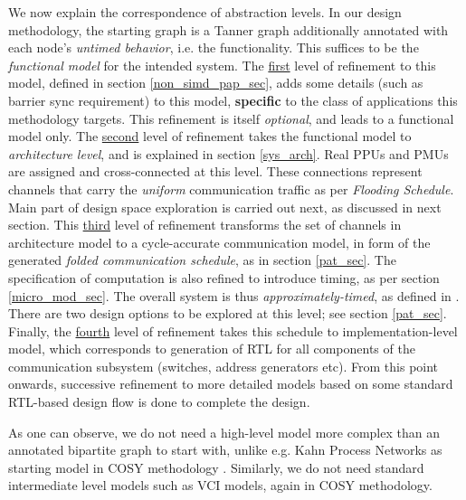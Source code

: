 \documentclass[12pt]{article}
\begin{document}
We now explain the correspondence of abstraction levels. In our design
methodology, the
starting graph is a Tanner graph additionally annotated with each node's
\textit{untimed behavior}, i.e. the functionality.
This suffices to be the
\textit{functional model} for the
intended system. The \uline{first} level of refinement to this model,
defined in section \ref{non_simd_pap_sec}, adds some details (such as
barrier sync requirement) to this model, \textbf{specific} to the class of
applications this methodology targets. This refinement is itself
\textit{optional}, and leads to a functional model only. The \uline{second}
level of refinement takes the functional model to \textit{architecture
level}, and
is explained in section \ref{sys_arch}. Real PPUs and
PMUs are  assigned and cross-connected at this level. These
connections represent channels that carry the \textit{uniform}
communication traffic as per \textit{Flooding Schedule}. Main part of
design space exploration is carried out next, as discussed in next section.
This \uline{third} level of refinement transforms the
set of channels in architecture model to a
cycle-accurate communication model, in form of the generated
\textit{folded communication schedule}, as in section \ref{pat_sec}.
The specification of computation is also refined to introduce
timing, as per section \ref{micro_mod_sec}. The overall system is thus
\textit{approximately-timed}, as defined in \cite{gajski_tlm_pap}. There
are two design options to be explored at this level; see section
\ref{pat_sec}. Finally, the \uline{fourth} level of refinement takes this
schedule to implementation-level model, which corresponds to
generation of RTL for all components of the communication
subsystem (switches, address generators etc). From this point onwards,
successive refinement to more detailed models based on some standard
RTL-based design flow is done to complete the design.

As one can observe, we do not need a high-level model more complex than
an annotated
bipartite graph to start with, unlike e.g. Kahn Process Networks as
starting model in COSY methodology \cite{cosy_methodology}. Similarly, we
do not need standard intermediate level models such as VCI
models, again in COSY methodology.
\end{document}
